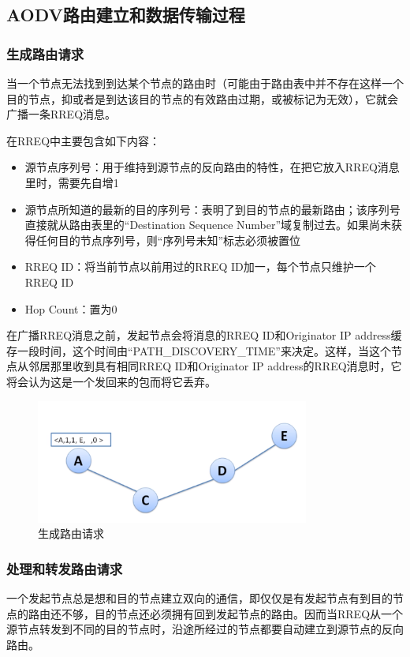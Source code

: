\documentclass[12pt,a4paper]{article}
\begin{document}
\subsection{AODV路由建立和数据传输过程}
\subsubsection{生成路由请求}
当一个节点无法找到到达某个节点的路由时（可能由于路由表中并不存在这样一个目的节点，抑或者是到达该目的节点的有效路由过期，或被标记为无效），它就会广播一条RREQ消息。

在RREQ中主要包含如下内容：

\begin{itemize}
	\item 源节点序列号：用于维持到源节点的反向路由的特性，在把它放入RREQ消息里时，需要先自增1
	\item 源节点所知道的最新的目的序列号：表明了到目的节点的最新路由；该序列号直接就从路由表里的“Destination Sequence Number”域复制过去。如果尚未获得任何目的节点序列号，则“序列号未知”标志必须被置位
	\item RREQ ID：将当前节点以前用过的RREQ ID加一，每个节点只维护一个RREQ ID
	\item Hop Count：置为0
\end{itemize}

在广播RREQ消息之前，发起节点会将消息的RREQ ID和Originator IP address缓存一段时间，这个时间由“PATH\_DISCOVERY\_TIME”来决定。这样，当这个节点从邻居那里收到具有相同RREQ ID和Originator IP address的RREQ消息时，它将会认为这是一个发回来的包而将它丢弃。

\begin{figure}[htb]
\centering
\includegraphics[width=9cm]{gen_route_request}
\caption{生成路由请求}
\end{figure}

\subsubsection{处理和转发路由请求}
一个发起节点总是想和目的节点建立双向的通信，即仅仅是有发起节点有到目的节点的路由还不够，目的节点还必须拥有回到发起节点的路由。因而当RREQ从一个源节点转发到不同的目的节点时，沿途所经过的节点都要自动建立到源节点的反向路由。
\end{document}
